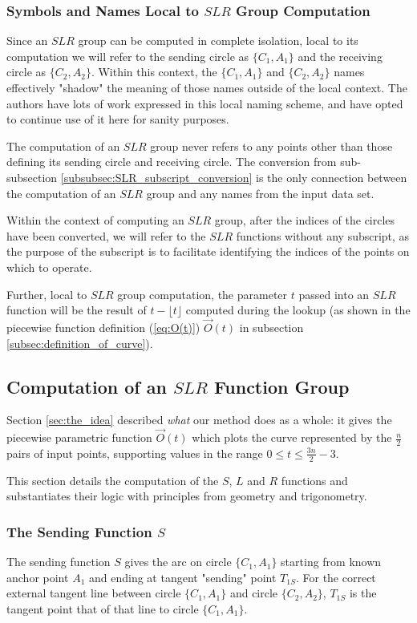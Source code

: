 \documentclass{article}
\begin{document}
\subsubsection{Symbols and Names Local to $SLR$ Group Computation}
\label{subsub:local_point_indices}
Since an $SLR$ group can be computed in complete isolation, local to its computation we will refer to the sending circle as $\{C_1, A_1\}$ and the receiving circle as $\{C_2, A_2\}$. Within this context, the $\{C_1, A_1\}$ and $\{C_2, A_2\}$ names effectively "shadow" the meaning of those names outside of the local context. The authors have lots of work expressed in this local naming scheme, and have opted to continue use of it here for sanity purposes.

The computation of an $SLR$ group never refers to any points other than those defining its sending circle and receiving circle. The conversion from sub-subsection \ref{subsubsec:SLR_subscript_conversion} is the only connection between the computation of an $SLR$ group and any names from the input data set.

Within the context of computing an $SLR$ group, after the indices of the circles have been converted, we will refer to the $SLR$ functions without any subscript, as the purpose of the subscript is to facilitate identifying the indices of the points on which to operate.

Further, local to $SLR$ group computation, the parameter $t$ passed into an $SLR$ function will be the result of $t - \lfloor t \rfloor$ computed during the lookup (as shown in the piecewise function definition (\ref{eq:O(t)}) $\overrightarrow{O}(t)$ in subsection \ref{subsec:definition_of_curve}).

\subsection{Computation of an $SLR$ Function Group}
\label{subsec:SLR_group_computation}
Section \ref{sec:the_idea} described \textit{what} our method does as a whole: it gives the piecewise parametric function $\overrightarrow{O}(t)$ which plots the curve represented by the $\frac{n}{2}$ pairs of input points, supporting values in the range $0 \leq t \leq \frac{3n}{2}-3$.

This section details the computation of the $S$, $L$ and $R$ functions and substantiates their logic with principles from geometry and trigonometry.

\subsubsection{The Sending Function $S$}
\label{subsubsec:sending_function_S}
The sending function $S$ gives the arc on circle $\{C_1, A_1\}$ starting from known anchor point $A_1$ and ending at tangent "sending" point $T_{1S}$. For the correct external tangent line between circle $\{C_1, A_1\}$ and circle $\{C_2, A_2\}$, $T_{1S}$ is the tangent point that of that line to circle $\{C_1, A_1\}$.
\end{document}
